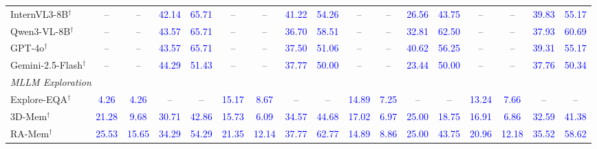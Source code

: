 \begin{table}[t]
{\begin{tabular}{lcccccccccccccccc}
InternVL3-8B$^\dagger$ & -- & -- & \textcolor{blue}{42.14} & \textcolor{blue}{65.71} & -- & -- & \textcolor{blue}{41.22} & \textcolor{blue}{54.26} & -- & -- & \textcolor{blue}{26.56} & \textcolor{blue}{43.75} & -- & -- & \textcolor{blue}{39.83} & \textcolor{blue}{55.17} \\
Qwen3-VL-8B$^\dagger$~\cite{bai2025qwen3} & -- & -- & \textcolor{blue}{43.57} & \textcolor{blue}{65.71} & -- & -- & \textcolor{blue}{36.70} & \textcolor{blue}{58.51} & -- & -- & \textcolor{blue}{32.81} & \textcolor{blue}{62.50} & -- & -- & \textcolor{blue}{37.93} & \textcolor{blue}{60.69} \\
GPT-4o$^\dagger$~\cite{openai2024gpt4o} & -- & -- & \textcolor{blue}{43.57} & \textcolor{blue}{65.71} & -- & -- & \textcolor{blue}{37.50} & \textcolor{blue}{51.06} & -- & -- & \textcolor{blue}{40.62} & \textcolor{blue}{56.25} & -- & -- & \textcolor{blue}{39.31} & \textcolor{blue}{55.17} \\
Gemini-2.5-Flash$^\dagger$ & -- & -- & \textcolor{blue}{44.29} & \textcolor{blue}{51.43} & -- & -- & \textcolor{blue}{37.77} & \textcolor{blue}{50.00} & -- & -- & \textcolor{blue}{23.44} & \textcolor{blue}{50.00} & -- & -- & \textcolor{blue}{37.76} & \textcolor{blue}{50.34} \\
\midrule
\multicolumn{17}{l}{\emph{MLLM Exploration}} \\
Explore-EQA$^\dagger$~\cite{ren2024exploreeqa} & \textcolor{blue}{4.26} & \textcolor{blue}{4.26} & -- & -- & \textcolor{blue}{15.17} & \textcolor{blue}{8.67} & -- & -- & \textcolor{blue}{14.89} & \textcolor{blue}{7.25} & -- & -- & \textcolor{blue}{13.24} & \textcolor{blue}{7.66} & -- & -- \\
3D-Mem$^\dagger$~\cite{huang20243dmem} & \textcolor{blue}{21.28} & \textcolor{blue}{9.68} & \textcolor{blue}{30.71} & \textcolor{blue}{42.86} & \textcolor{blue}{15.73} & \textcolor{blue}{6.09} & \textcolor{blue}{34.57} & \textcolor{blue}{44.68} & \textcolor{blue}{17.02} & \textcolor{blue}{6.97} & \textcolor{blue}{25.00} & \textcolor{blue}{18.75} & \textcolor{blue}{16.91} & \textcolor{blue}{6.86} & \textcolor{blue}{32.59} & \textcolor{blue}{41.38} \\
RA-Mem$^\dagger$~\cite{yang2024ramem} & \textcolor{blue}{25.53} & \textcolor{blue}{15.65} & \textcolor{blue}{34.29} & \textcolor{blue}{54.29} & \textcolor{blue}{21.35} & \textcolor{blue}{12.14} & \textcolor{blue}{37.77} & \textcolor{blue}{62.77} & \textcolor{blue}{14.89} & \textcolor{blue}{8.86} & \textcolor{blue}{25.00} & \textcolor{blue}{43.75} & \textcolor{blue}{20.96} & \textcolor{blue}{12.18} & \textcolor{blue}{35.52} & \textcolor{blue}{58.62} \\

\end{tabular}}
\end{table}
